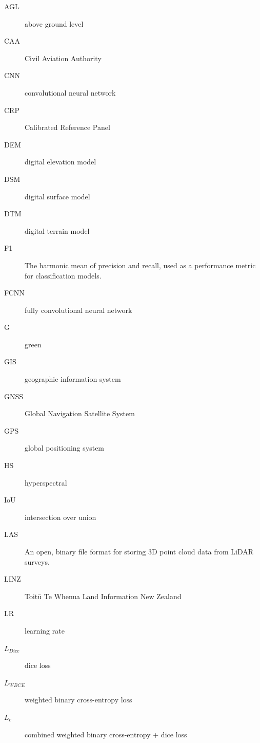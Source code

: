 \documentclass[
]{scrreprt}
\begin{document}
\begin{description}
\item[\label{acronyms_AGL}{AGL}]
above ground level
\item[\label{acronyms_CAA}{CAA}]
Civil Aviation Authority
\item[\label{acronyms_CNN}{CNN}]
convolutional neural network
\item[\label{acronyms_CRP}{CRP}]
Calibrated Reference Panel
\item[\label{acronyms_DEM}{DEM}]
digital elevation model
\item[\label{acronyms_DSM}{DSM}]
digital surface model
\item[\label{acronyms_DTM}{DTM}]
digital terrain model
\item[\label{acronyms_F1}{F1}]
The harmonic mean of precision and recall, used as a performance metric
for classification models.
\item[\label{acronyms_FCNN}{FCNN}]
fully convolutional neural network
\item[\label{acronyms_G}{G}]
green
\item[\label{acronyms_GIS}{GIS}]
geographic information system
\item[\label{acronyms_GNSS}{GNSS}]
Global Navigation Satellite System
\item[\label{acronyms_GPS}{GPS}]
global positioning system
\item[\label{acronyms_HS}{HS}]
hyperspectral
\item[\label{acronyms_IoU}{IoU}]
intersection over union
\item[\label{acronyms_LAS}{LAS}]
An open, binary file format for storing 3D point cloud data from LiDAR
surveys.
\item[\label{acronyms_LINZ}{LINZ}]
Toitū Te Whenua Land Information New Zealand
\item[\label{acronyms_LR}{LR}]
learning rate
\item[\label{acronyms_DICE}{\(L_{Dice}\)}]
dice loss
\item[\label{acronyms_WBCE}{\(L_{WBCE}\)}]
weighted binary cross-entropy loss
\item[\label{acronyms_WBCE_D}{\(L_{c}\)}]
combined weighted binary cross-entropy + dice loss

\end{description}
\end{document}
